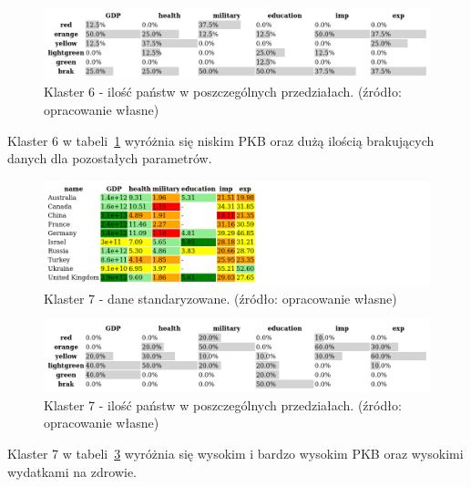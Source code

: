 \documentclass[11pt]{report}
\begin{document}
    \begin{figure}[!htp]
        \centering
        \includegraphics[width=1 \textwidth]{tables/CLUST/cluster6stdkmeanscount.png}
        \caption{Klaster 6 - ilość państw w poszczególnych przedziałach. (źródło: opracowanie własne)}
        \label{tab:cl6stdcount}
    \end{figure}

    Klaster 6 w tabeli~\ref{tab:cl6stdcount} wyróżnia się niskim PKB oraz dużą ilością brakujących danych dla pozostałych parametrów.

    

    \begin{figure}[!htp]
        \centering
        \includegraphics[width=1 \textwidth]{tables/CLUST/cluster7stdkmeans.png}
        \caption{Klaster 7 - dane standaryzowane. (źródło: opracowanie własne)}
        \label{tab:cl7std}
    \end{figure}

    \begin{figure}[!htp]
        \centering
        \includegraphics[width=1 \textwidth]{tables/CLUST/cluster7stdkmeanscount.png}
        \caption{Klaster 7 - ilość państw w poszczególnych przedziałach. (źródło: opracowanie własne)}
        \label{tab:cl7stdcount}
    \end{figure}

    Klaster 7 w tabeli~\ref{tab:cl7stdcount} wyróżnia się wysokim i bardzo wysokim PKB oraz wysokimi wydatkami na zdrowie.

    
\end{document}
